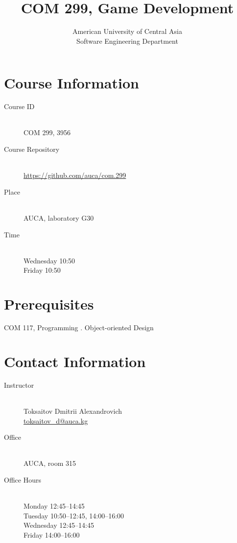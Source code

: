 \documentclass[12pt,a4paper,oneside]{article}
\newcommand{\R}[1]{\uppercase\expandafter{\romannumeral #1\relax}}
\begin{document}
    \title{COM 299, Game Development}
    \author{
        American University of Central Asia\\
        Software Engineering Department
    }
    \date{}
    \maketitle

    \section{Course Information}

        \begin{description}
            \item[Course ID]\hfill\\
                COM 299, 3956
            \item[Course Repository]\hfill\\
                \url{https://github.com/auca/com.299}
            \item[Place]\hfill\\
                AUCA, laboratory G30
            \item[Time]\hfill\\
                Wednesday 10:50\\
                Friday 10:50
        \end{description}

    \section{Prerequisites}

        COM 117, Programming \R{2}. Object-oriented Design

    \section{Contact Information}

        \begin{description}
            \item[Instructor]\hfill\\
                Toksaitov Dmitrii Alexandrovich\\
                \href{mailto:toksaitov_d@auca.kg}{toksaitov\_d@auca.kg}
            \item[Office]\hfill\\
                AUCA, room 315
            \item[Office Hours]\hfill\\
                Monday 12:45--14:45\\
                Tuesday 10:50--12:45, 14:00--16:00\\
                Wednesday 12:45--14:45\\
                Friday 14:00--16:00
        \end{description}
\end{document}
